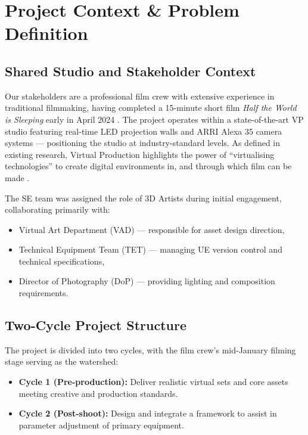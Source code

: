 \documentclass[12pt,a4paper]{report}
\begin{document}
\section{Project Context \& Problem Definition}

\subsection{Shared Studio and Stakeholder Context}
Our stakeholders are a professional film crew with extensive experience in traditional filmmaking, having completed a 15-minute short film \textit{Half the World is Sleeping} early in April 2024 \cite{half_the_world_is_sleeping}. The project operates within a state-of-the-art VP studio featuring real-time LED projection walls and ARRI Alexa 35 camera systems — positioning the studio at industry-standard levels. As defined in existing research, Virtual Production highlights the power of ``virtualising technologies'' to create digital environments in, and through which film can be made \cite{willment_swords_2023_vp}.

The SE team was assigned the role of 3D Artists during initial engagement, collaborating primarily with:
\begin{itemize}
    \item Virtual Art Department (VAD) — responsible for asset design direction,
    \item Technical Equipment Team (TET) — managing UE version control and technical specifications,
    \item Director of Photography (DoP) — providing lighting and composition requirements.
\end{itemize}

\subsection{Two-Cycle Project Structure}
The project is divided into two cycles, with the film crew's mid-January filming stage serving as the watershed:
\begin{itemize}
    \item \textbf{Cycle 1 (Pre-production):} Deliver realistic virtual sets and core assets meeting creative and production standards.
    \item \textbf{Cycle 2 (Post-shoot):} Design and integrate a framework to assist in parameter adjustment of primary equipment.
\end{itemize}
\end{document}
